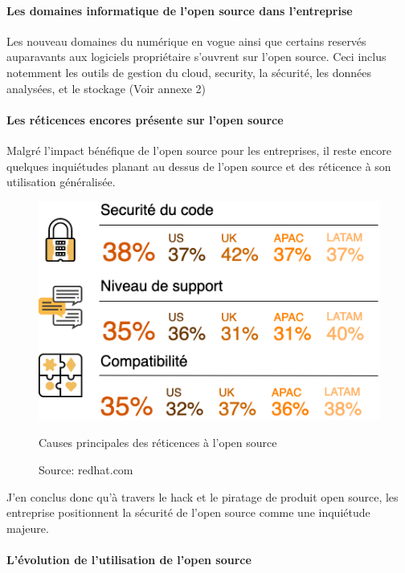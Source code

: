 				\paragraph{Les domaines informatique de l'open source dans l'entreprise\\}

					Les nouveau domaines du numérique en vogue ainsi que certains reservés auparavants aux logiciels propriétaire s'ouvrent sur l'open source. Ceci inclus notemment les outils de gestion du cloud, security, la sécurité, les données analysées, et le stockage (Voir annexe 2)

				\clearpage
				\paragraph{Les réticences encores présente sur l'open source\\}

					Malgré l'impact bénéfique de l'open source pour les entreprises, il reste encore quelques inquiétudes planant au dessus de l'open source et des réticence à son utilisation généralisée.

					\begin{figure}[h]
						\center
						\includegraphics[scale=0.70]{./img/Barreer_os.png}
						\caption{Causes principales des réticences à l'open source}
						\caption*{\color{silver}Source: redhat.com}					
					\end{figure}										

					J'en conclus donc qu'à travers le hack et le piratage de produit open source, les entreprise positionnent la sécurité de l'open source comme une inquiétude majeure.

				\paragraph{L'évolution de l'utilisation de l'open source\\}

